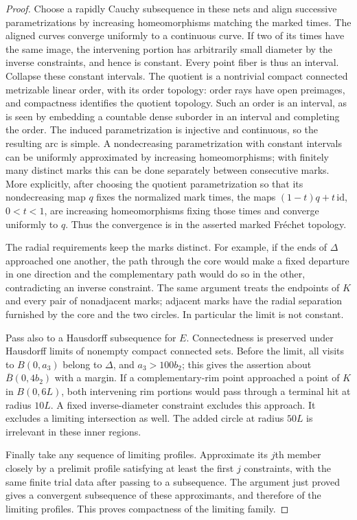 \begin{proof}
Choose a rapidly Cauchy subsequence in these nets and align successive
parametrizations by increasing homeomorphisms matching the marked
times.  The aligned curves converge uniformly to a continuous curve.
If two of its times have the same image, the intervening portion has
arbitrarily small diameter by the inverse constraints, and hence is
constant.  Every point fiber is thus an interval.  Collapse these
constant intervals.  The quotient is a nontrivial compact connected
metrizable linear order, with its order topology: order rays have open
preimages, and compactness identifies the quotient topology.  Such an
order is an interval, as is seen by embedding a countable dense suborder
in an interval and completing the order.  The induced parametrization
is injective and continuous, so the resulting arc is simple.  A
nondecreasing parametrization with constant intervals can be uniformly
approximated by increasing homeomorphisms; with finitely many distinct
marks this can be done separately between consecutive marks.  More
explicitly, after choosing the quotient parametrization so that its
nondecreasing map $q$ fixes the normalized mark times, the maps
$(1-t)q+t\,\mathrm{id}$, $0<t<1$, are increasing homeomorphisms fixing
those times and converge uniformly to $q$.  Thus the
convergence is in the asserted marked Fr\'echet topology.

The radial requirements keep the marks distinct.  For example, if the
ends of $\Delta$ approached one another, the path through the core
would make a fixed departure in one direction and the complementary
path would do so in the other, contradicting an inverse constraint.
The same argument treats the endpoints of $K$ and every pair of
nonadjacent marks; adjacent marks have the radial separation furnished
by the core and the two circles.  In particular the limit is not
constant.

Pass also to a Hausdorff subsequence for $E$.  Connectedness is preserved
under Hausdorff limits of nonempty compact connected sets.  Before the
limit, all visits to $B(0,a_3)$ belong to $\Delta$, and
$a_3>100b_2$; this gives the assertion about
$\overline B(0,4b_2)$ with a margin.  If a complementary-rim point
approached a point of $K$ in $B(0,6L)$, both intervening rim portions
would pass through a terminal hit at radius $10L$.  A fixed
inverse-diameter constraint excludes this approach.  It excludes a
limiting intersection as well.  The added circle at radius $50L$ is
irrelevant in these inner regions.

Finally take any sequence of limiting profiles.  Approximate its $j$th
member closely by a prelimit profile satisfying at least the first $j$
constraints, with the same finite trial data after passing to a
subsequence.  The argument just proved gives a convergent subsequence
of these approximants, and therefore of the limiting profiles.  This
proves compactness of the limiting family.
\end{proof}

